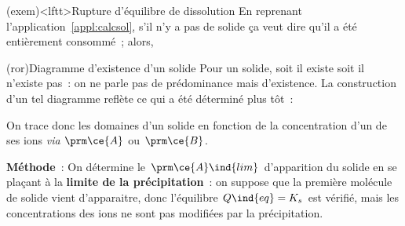 \documentclass[../../main/main.tex]{subfiles}
\begin{document}
\begin{tcb*}(exem)<lftt>{Rupture d'équilibre de dissolution}
  En reprenant l'application~\ref{appl:calcsol}, s'il n'y a pas de solide ça
  veut dire qu'il a été entièrement consommé~; alors,
  \vspace{-15pt}
\end{tcb*}

\begin{tcb*}(ror){Diagramme d'existence d'un solide}
  Pour un solide, soit il existe soit il n'existe pas~: on ne parle pas de
  prédominance mais d'existence. La construction d'un tel diagramme reflète ce
  qui a été déterminé plus tôt~:
  \begin{center}
    \textbf{}
  \end{center}
  On trace donc les domaines d'un solide  en fonction de la
  concentration d'un de ses ions \textit{via} $\prm \ce{A}$ ou $\prm \ce{B}$.
  \begin{center}
  \end{center}
  \textbf{Méthode}~:
  On détermine le $\prm \ce{A}\ind{lim}$ d’apparition du solide en se plaçant à
  la \textbf{limite de la précipitation}~: on suppose que la première molécule
  de solide vient d’apparaitre, donc l’équilibre $Q\ind{eq} = K_s$ est vérifié,
  mais les concentrations des ions ne sont pas modifiées par la précipitation.
\end{tcb*}
\end{document}
